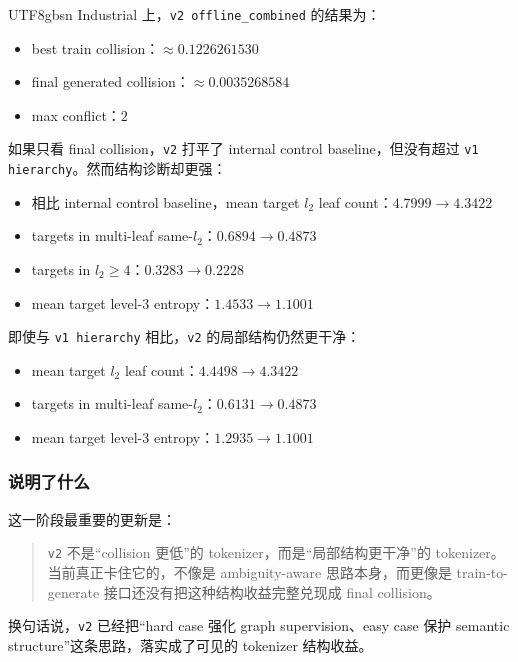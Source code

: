 \documentclass[11pt]{article}
\begin{document}
\begin{CJK*}{UTF8}{gbsn}
Industrial 上，\texttt{v2 offline\_combined} 的结果为：

\begin{itemize}
  \item best train collision：\(\approx 0.1226261530\)
  \item final generated collision：\(\approx 0.0035268584\)
  \item max conflict：\(2\)
\end{itemize}

如果只看 final collision，\texttt{v2} 打平了 internal control baseline，但没有超过 \texttt{v1 hierarchy}。然而结构诊断却更强：

\begin{itemize}
  \item 相比 internal control baseline，mean target \(l_2\) leaf count：\(4.7999 \rightarrow 4.3422\)
  \item targets in multi-leaf same-\(l_2\)：\(0.6894 \rightarrow 0.4873\)
  \item targets in \(l_2 \ge 4\)：\(0.3283 \rightarrow 0.2228\)
  \item mean target level-3 entropy：\(1.4533 \rightarrow 1.1001\)
\end{itemize}

即使与 \texttt{v1 hierarchy} 相比，\texttt{v2} 的局部结构仍然更干净：

\begin{itemize}
  \item mean target \(l_2\) leaf count：\(4.4498 \rightarrow 4.3422\)
  \item targets in multi-leaf same-\(l_2\)：\(0.6131 \rightarrow 0.4873\)
  \item mean target level-3 entropy：\(1.2935 \rightarrow 1.1001\)
\end{itemize}

\subsubsection*{说明了什么}

这一阶段最重要的更新是：

\begin{quote}
\texttt{v2} 不是“collision 更低”的 tokenizer，而是“局部结构更干净”的 tokenizer。当前真正卡住它的，不像是 ambiguity-aware 思路本身，而更像是 train-to-generate 接口还没有把这种结构收益完整兑现成 final collision。
\end{quote}

换句话说，\texttt{v2} 已经把“hard case 强化 graph supervision、easy case 保护 semantic structure”这条思路，落实成了可见的 tokenizer 结构收益。


\end{CJK*}
\end{document}
